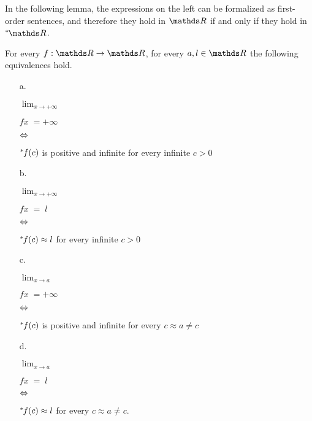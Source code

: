 In the following lemma, the expressions on the left can be formalized as first-order sentences, and therefore they hold in $\RR$ if and only if they hold in $\nsR$.

\begin{proposition}\label{prop_fattolimitinonstandard}
For every $f:\RR\to\RR$, for every $a, l\in\RR$ the following equivalences hold.\nobreak
\begin{itemize}
\item[a.]\parbox{7ex}{\hfil$\displaystyle\lim_{x\to+\infty}$}
\parbox{10ex}{$fx\;=+\infty$}
\parbox{5ex}{\hfil$\Leftrightarrow$}
${}^*\kern-.2ex f(c)$ is positive and infinite for every infinite $c>0$

\item[b.]\parbox{7ex}{\hfil$\displaystyle\lim_{x\to+\infty}$}
\parbox{10ex}{$fx\;=\;l$}
\parbox{5ex}{\hfil$\Leftrightarrow$}
${}^*\kern-.2ex f(c)\approx l$ for every infinite $c>0$

\item[c.]\parbox{7ex}{\hfil$\displaystyle\lim_{x\to a}$}
\parbox{10ex}{$fx\;=+\infty$}
\parbox{5ex}{\hfil$\Leftrightarrow$}
${}^*\kern-.2ex f(c)$ is positive and infinite for every $c\approx a\neq c$

\item[d.]\parbox{7ex}{\hfil$\displaystyle\lim_{x\to a}$}
\parbox{10ex}{$fx\;=\;l$}
\parbox{5ex}{\hfil$\Leftrightarrow$}
${}^*\kern-.2ex f(c)\approx l$ for every $c\approx a\neq c$.
\end{itemize}
\end{proposition}

